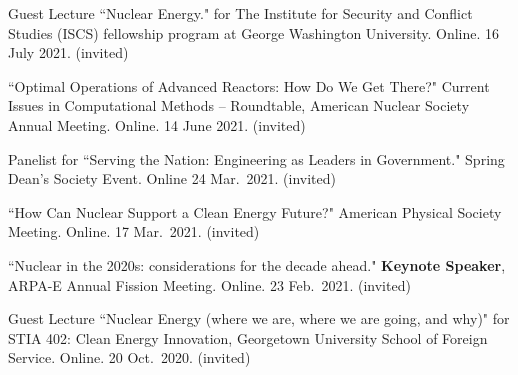 \begin{bibsection}



\item Guest Lecture ``Nuclear Energy." for The Institute for Security and Conflict Studies (ISCS) fellowship program at George Washington University. Online. 16 July 2021. (invited)

\item ``Optimal Operations of Advanced Reactors: How Do We Get There?" Current Issues in Computational Methods -- Roundtable, American Nuclear Society Annual Meeting. Online. 14 June 2021. (invited)


\item Panelist for ``Serving the Nation: Engineering as Leaders in Government." Spring Dean's Society Event. Online 24 Mar.\ 2021. (invited)

\item ``How Can Nuclear Support a Clean Energy Future?"  American Physical Society Meeting. Online. 17 Mar.\ 2021. (invited)

\item ``Nuclear in the 2020s: considerations for the decade ahead." \textbf{Keynote Speaker}, ARPA-E Annual Fission Meeting. Online. 23 Feb.\ 2021. (invited)

\item Guest Lecture ``Nuclear Energy (where we are, where we are going, and why)" for STIA 402: Clean Energy Innovation, Georgetown University School of Foreign Service. Online. 20 Oct.\ 2020. (invited)




\end{bibsection}
